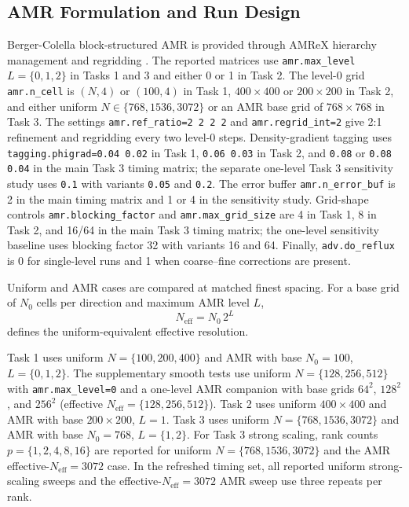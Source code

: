 \documentclass[final,3p,times,twocolumn]{elsarticle}
\begin{document}
\subsection{AMR Formulation and Run Design}

Berger-Colella block-structured AMR \cite{berger1989} is provided through AMReX hierarchy management and regridding \cite{AMReX_JOSS,AMReX_IJHPCA1,amrexdocs}. The reported matrices use \texttt{amr.max\_level} $L=\{0,1,2\}$ in Tasks 1 and 3 and either 0 or 1 in Task 2. The level-0 grid \texttt{amr.n\_cell} is $(N,4)$ or $(100,4)$ in Task 1, $400\times400$ or $200\times200$ in Task 2, and either uniform $N\in\{768,1536,3072\}$ or an AMR base grid of $768\times768$ in Task 3. The settings \texttt{amr.ref\_ratio=2 2 2 2} and \texttt{amr.regrid\_int=2} give 2:1 refinement and regridding every two level-0 steps. Density-gradient tagging uses \texttt{tagging.phigrad=0.04 0.02} in Task 1, \texttt{0.06 0.03} in Task 2, and \texttt{0.08} or \texttt{0.08 0.04} in the main Task 3 timing matrix; the separate one-level Task 3 sensitivity study uses \texttt{0.1} with variants \texttt{0.05} and \texttt{0.2}. The error buffer \texttt{amr.n\_error\_buf} is 2 in the main timing matrix and 1 or 4 in the sensitivity study. Grid-shape controls \texttt{amr.blocking\_factor} and \texttt{amr.max\_grid\_size} are 4 in Task 1, 8 in Task 2, and 16/64 in the main Task 3 timing matrix; the one-level sensitivity baseline uses blocking factor 32 with variants 16 and 64. Finally, \texttt{adv.do\_reflux} is 0 for single-level runs and 1 when coarse--fine corrections are present.

Uniform and AMR cases are compared at matched finest spacing. For a base grid of $N_0$ cells per direction and maximum AMR level $L$,
\begin{equation}
N_\mathrm{eff}=N_0\,2^L
\end{equation}
defines the uniform-equivalent effective resolution.

Task 1 uses uniform $N=\{100,200,400\}$ and AMR with base $N_0=100$, $L=\{0,1,2\}$. The supplementary smooth tests use uniform $N=\{128,256,512\}$ with \texttt{amr.max\_level=0} and a one-level AMR companion with base grids $64^2$, $128^2$, and $256^2$ (effective $N_\mathrm{eff}=\{128,256,512\}$). Task 2 uses uniform $400\times400$ and AMR with base $200\times200$, $L=1$. Task 3 uses uniform $N=\{768,1536,3072\}$ and AMR with base $N_0=768$, $L=\{1,2\}$. For Task 3 strong scaling, rank counts $p=\{1,2,4,8,16\}$ are reported for uniform $N=\{768,1536,3072\}$ and the AMR effective-$N_\mathrm{eff}=3072$ case. In the refreshed timing set, all reported uniform strong-scaling sweeps and the effective-$N_\mathrm{eff}=3072$ AMR sweep use three repeats per rank.
\end{document}
